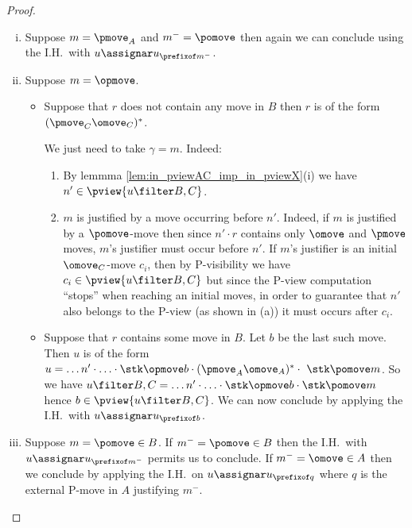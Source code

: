 \begin{proof}
\begin{enumerate}[i.]
\item Suppose $m = \pmove_A$ and $m^- = \pomove$ then again we can conclude using the I.H.\ with $u \assignar u_{\prefixof m^-}$.

\item Suppose $m = \opmove$.
\begin{itemize}[-]
\item Suppose that $r$ does not contain any move in $B$  then $r$ is of the form $(\pmove_C \omove_C)^*$.

We just need to take $\gamma = m$.
Indeed:
\begin{enumerate}
\item By lemmma \ref{lem:in_pviewAC_imp_in_pviewX}(i)
we have $n'\in \pview{u\filter B,C}$.

\item  $m$ is justified by a move occurring before $n'$.
Indeed, if $m$ is justified by a $\pomove$-move then since $n' \cdot r$ contains only $\omove$ and $\pmove$ moves, $m$'s justifier must occur before $n'$.
If $m$'s justifier is an initial $\omove_C$-move $c_i$, then
by P-visibility we have $c_i \in \pview{u\filter B,C}$
but since the P-view computation ``stops'' when reaching an initial moves, in order to guarantee that $n'$ also belongs to the P-view (as shown in (a)) it must
occurs after $c_i$.
\end{enumerate}


\item Suppose that $r$ contains some move in $B$. Let $b$ be the last such move. Then $u$ is of the form $u = \ldots n' \cdot \ldots \cdot \stk\opmove  b \cdot (\pmove_A \omove_A)^* \cdot\ \stk\pomove m $.
So we have
$u\filter B,C = \ldots n' \cdot \ldots \cdot \stk\opmove  b \cdot \stk\pomove m $ hence $b \in \pview{u\filter B,C}$. We can now
conclude by applying the I.H.\ with $u \assignar u_{\prefixof b}$.
\end{itemize}

\item Suppose $m = \pomove \in B$.
If $m^- = \pomove \in B$ then the I.H.\ with $u \assignar u_{\prefixof m^-}$ permits us to conclude.
If $m^- = \omove \in A$ then we conclude by applying the I.H.\ on $u \assignar u_{\prefixof q}$ where $q$ is the external P-move in $A$ justifying $m^-$.
\end{enumerate}
\end{proof}

